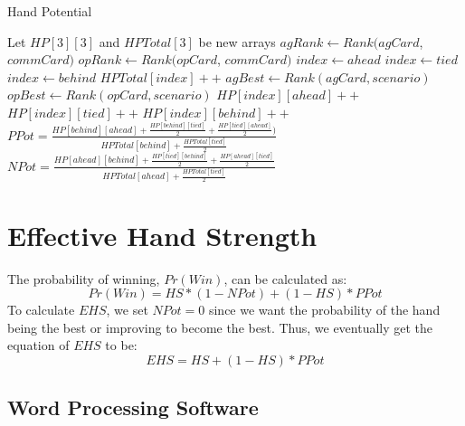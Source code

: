 \documentclass{article}
\begin{document}
  \begin{algorithm}
   \caption{Hand Potential}
    \begin{algorithmic}[1]
        \State Let $HP[3][3]$ and $HPTotal[3]$ be new arrays
        \State $agRank \leftarrow Rank(agCard$, $commCard)$
            \State $opRank \leftarrow Rank(opCard$, $commCard)$
              \State $index \leftarrow ahead$
              \State $index \leftarrow tied$
            \Else
              \State $index \leftarrow behind$
            \EndIf
            \State $HPTotal[index]++$
              \State $agBest \leftarrow Rank(agCard, scenario)$
              \State $opBest \leftarrow Rank(opCard, scenario)$
                \State $HP[index][ahead]++$
                \State $HP[index][tied]++$
              \Else
                \State $HP[index][behind]++$
              \EndIf
            \EndFor
        \EndFor
        \State $PPot=\frac{HP[behind][ahead] + \frac{HP[behind][tied]}{2} +
  \frac{HP[tied][ahead]}{2})}{HPTotal[behind]+\frac{HPTotal[tied]}{2}}$
		\State $NPot = \frac{HP[ahead][behind] + \frac{HP[tied][behind]}{2} + \frac{HP[ahead][tied]}{2}}{HPTotal[ahead]+\frac{HPTotal[tied]}{2}}$
        \State{}
      \EndFunction
    \end{algorithmic}
  \end{algorithm}

\section{Effective Hand Strength}
The probability of winning, $Pr(Win)$, can be calculated as:
\begin{displaymath}
  Pr(Win) = HS * (1-NPot) + (1-HS) * PPot
\end{displaymath}
To calculate $EHS$, we set $NPot=0$ since we want the probability of the hand being the best or improving to become the best. Thus, we eventually get the equation of $EHS$ to be:
\begin{displaymath}
  EHS = HS +(1-HS) * PPot
\end{displaymath}

\subsection{Word Processing Software}
\end{document}
